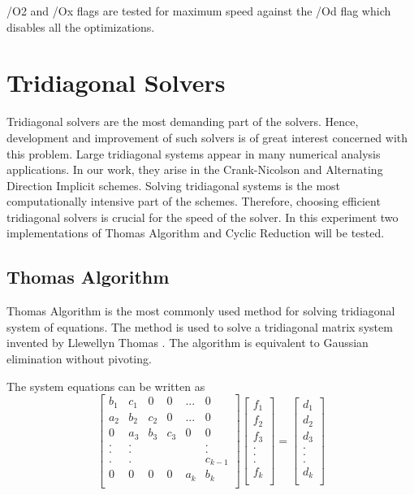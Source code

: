 \documentclass[12pt, oneside]{book}
\theoremstyle{plain}
\theoremstyle{definition}
\begin{document}
/O2 and /Ox flags are tested for maximum speed against the /Od flag which disables all the optimizations.
 
\section{Tridiagonal Solvers}
Tridiagonal solvers are the most demanding part of the solvers. Hence, development and improvement of such solvers is of great interest \cite{terekhov} \cite{chavez} \cite{hofen} \cite{austin} concerned with this problem.  Large tridiagonal systems appear in many numerical analysis applications. In our work, they arise in the Crank-Nicolson and Alternating Direction Implicit schemes.  Solving tridiagonal systems is the most computationally intensive part of the schemes. Therefore, choosing efficient tridiagonal solvers is crucial for the speed of the solver. In this experiment two implementations of Thomas Algorithm and Cyclic Reduction will be tested.

\subsection{Thomas Algorithm}
Thomas Algorithm is the most commonly used method for solving tridiagonal system of equations. The method is used to solve a tridiagonal matrix system invented by Llewellyn Thomas \cite{thomas}. The algorithm is equivalent to Gaussian elimination without pivoting.   

The system equations can be written as
$$
\begin{bmatrix}  
b_1 & c_1 & 0 & 0 & ... & 0 \\ 
a_2 & b_2 & c_2 & 0 & ... & 0 \\ 
0 & a_3 & b_3 & c_3 & 0 & 0 \\ 
. & . &  &  &  & . \\ 
. & . &  &  &  & . \\ 
. & . &  &  &  & c_{k-1} \\ 
0 & 0 & 0 & 0 & a_k & b_k \\ 
\end{bmatrix} \begin{bmatrix}  
f_1 \\ 
f_2 \\ 
f_3 \\ 
.\\ 
.\\ 
.\\ 
f_k \\ 
\end{bmatrix} = \begin{bmatrix} 
d_1 \\ 
d_2 \\ 
d_3 \\ 
.\\ 
.\\ 
.\\ 
d_k \\ 
\end{bmatrix}
$$
\end{document}

